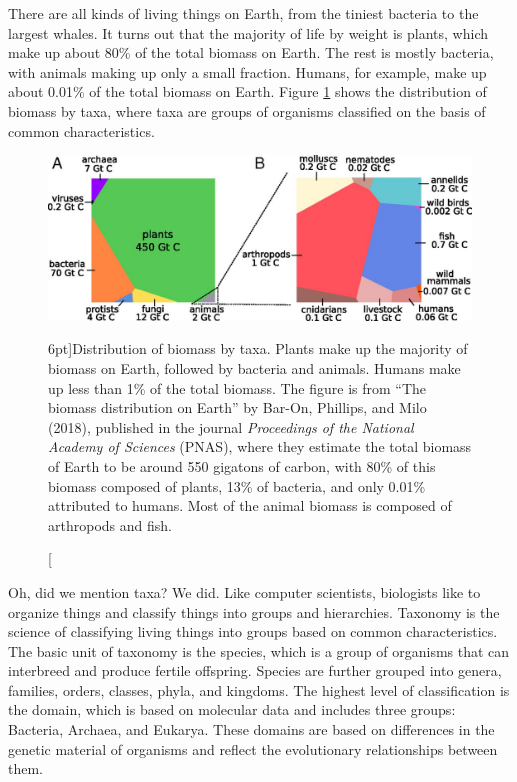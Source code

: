 There are all kinds of living things on Earth, from the tiniest bacteria to the largest whales. It turns out that the majority of life by weight is plants, which make up about 80\% of the total biomass on Earth. The rest is mostly bacteria, with animals making up only a small fraction. Humans, for example, make up about 0.01\% of the total biomass on Earth. Figure \ref{fig:biomass} shows the distribution of biomass by taxa, where taxa are groups of organisms classified on the basis of common characteristics.

\begin{figure}
  \includegraphics{figs/molbiol/biomass.jpeg}
  \caption[][6pt]{Distribution of biomass by taxa. Plants make up the majority of biomass on Earth, followed by bacteria and animals. Humans make up less than 1\% of the total biomass. The figure is from ``The biomass distribution on Earth'' by Bar-On, Phillips, and Milo (2018), published in the journal {\em Proceedings of the National Academy of Sciences} (PNAS), where they estimate the total biomass of Earth to be around 550 gigatons of carbon, with 80\% of this biomass composed of plants, 13\% of bacteria, and only 0.01\% attributed to humans. Most of the animal biomass is composed of arthropods and fish.}
  \label{fig:biomass}
\end{figure}

Oh, did we mention taxa? We did. Like computer scientists, biologists like to organize things and classify things into groups and hierarchies. Taxonomy is the science of classifying living things into groups based on common characteristics. The basic unit of taxonomy is the species, which is a group of organisms that can interbreed and produce fertile offspring. Species are further grouped into genera, families, orders, classes, phyla, and kingdoms. The highest level of classification is the domain, which is based on molecular data and includes three groups: Bacteria, Archaea, and Eukarya. These domains are based on differences in the genetic material of organisms and reflect the evolutionary relationships between them.

